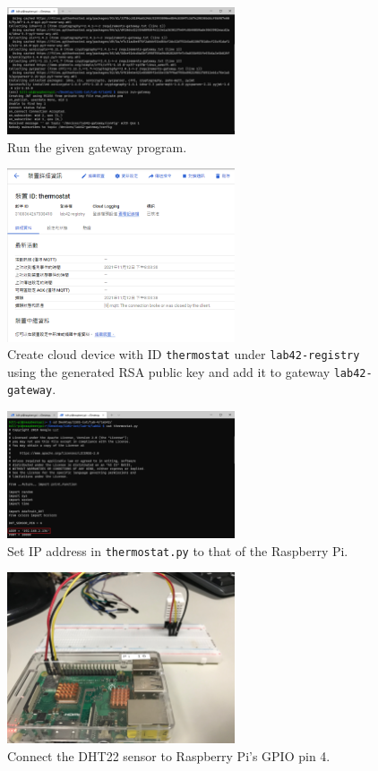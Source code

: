 \documentclass[12pt, a4paper, onside]{article}
\begin{document}
\begin{figure}[h]
  \centering
  \includegraphics[width=0.6\textwidth]{img/8_local_run_gateway}
  \caption{Run the given gateway program.}
\end{figure}

\begin{figure}[h]
  \centering
  \includegraphics[width=0.6\textwidth]{img/9_cloud_device}
  \caption{Create cloud device with ID \texttt{thermostat} under \texttt{lab42-registry} using the generated RSA public key and add it to gateway \texttt{lab42-gateway}.}
\end{figure}

\begin{figure}[h]
  \centering
  \includegraphics[width=0.6\textwidth]{img/10_local_set_ip}
  \caption{Set IP address in \texttt{thermostat.py} to that of the Raspberry Pi.}
\end{figure}

\begin{figure}[h]
  \centering
  \includegraphics[width=0.6\textwidth]{img/11_local_connect_pin_4}
  \caption{Connect the DHT22 sensor to Raspberry Pi's GPIO pin 4.}
\end{figure}
\end{document}

